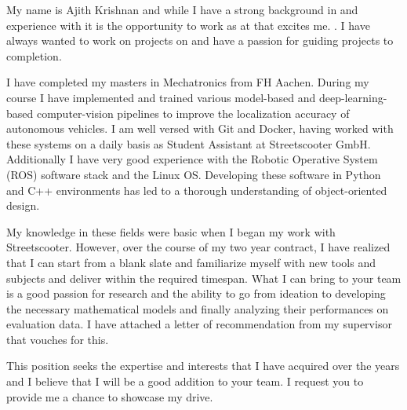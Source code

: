 \documentclass[11pt,a4paper,roman]{moderncv} %
\begin{document}
\justify

My name is Ajith Krishnan and while I have a strong background in  and experience with   
it is the opportunity to work as \position at \institute that excites me. \instidescr. 
I have always wanted to work on projects on \projdescr and have a passion for guiding projects to completion.

I have completed my masters in Mechatronics from FH Aachen. During my course I have implemented and trained various model-based and 
deep-learning-based computer-vision pipelines to improve the localization accuracy of autonomous vehicles. I am well versed with Git and Docker, 
having worked with these systems on a daily basis as Student Assistant at Streetscooter GmbH. Additionally I have very good experience with the Robotic Operative System (ROS) software stack 
and the Linux OS. Developing these software in Python and C++ environments has led to a thorough understanding of object-oriented design.
    
My knowledge in these fields were basic when I began my work with Streetscooter. However, over the course of my two year contract, 
I have realized that I can start from a blank slate and familiarize myself with new tools and subjects and deliver within the required timespan. What I can bring to your team is a 
good passion for research and the ability to go from ideation to developing the necessary mathematical models 
and finally analyzing their performances on evaluation data. I have attached a letter of recommendation from my supervisor that vouches for this.

This position seeks the expertise and interests that I have acquired over the years and I believe that I will be a good addition to your team. 
I request you to provide me a chance to showcase my drive.   

\vspace{20pt}
\makeletterclosing %





\newpage

%
\end{document}
